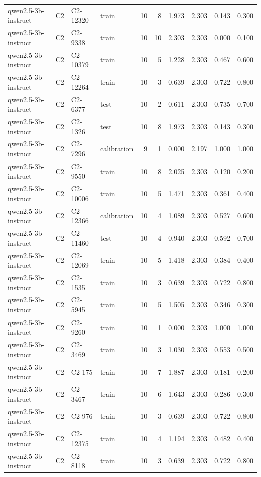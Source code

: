 \begin{table}
\begin{tabular}{llllrrrrrr}
qwen2.5-3b-instruct & C2 & C2-12320 & train & 10 & 8 & 1.973 & 2.303 & 0.143 & 0.300 \\
qwen2.5-3b-instruct & C2 & C2-9338 & train & 10 & 10 & 2.303 & 2.303 & 0.000 & 0.100 \\
qwen2.5-3b-instruct & C2 & C2-10379 & train & 10 & 5 & 1.228 & 2.303 & 0.467 & 0.600 \\
qwen2.5-3b-instruct & C2 & C2-12264 & train & 10 & 3 & 0.639 & 2.303 & 0.722 & 0.800 \\
qwen2.5-3b-instruct & C2 & C2-6377 & test & 10 & 2 & 0.611 & 2.303 & 0.735 & 0.700 \\
qwen2.5-3b-instruct & C2 & C2-1326 & test & 10 & 8 & 1.973 & 2.303 & 0.143 & 0.300 \\
qwen2.5-3b-instruct & C2 & C2-7296 & calibration & 9 & 1 & 0.000 & 2.197 & 1.000 & 1.000 \\
qwen2.5-3b-instruct & C2 & C2-9550 & train & 10 & 8 & 2.025 & 2.303 & 0.120 & 0.200 \\
qwen2.5-3b-instruct & C2 & C2-10006 & train & 10 & 5 & 1.471 & 2.303 & 0.361 & 0.400 \\
qwen2.5-3b-instruct & C2 & C2-12366 & calibration & 10 & 4 & 1.089 & 2.303 & 0.527 & 0.600 \\
qwen2.5-3b-instruct & C2 & C2-11460 & test & 10 & 4 & 0.940 & 2.303 & 0.592 & 0.700 \\
qwen2.5-3b-instruct & C2 & C2-12069 & train & 10 & 5 & 1.418 & 2.303 & 0.384 & 0.400 \\
qwen2.5-3b-instruct & C2 & C2-1535 & train & 10 & 3 & 0.639 & 2.303 & 0.722 & 0.800 \\
qwen2.5-3b-instruct & C2 & C2-5945 & train & 10 & 5 & 1.505 & 2.303 & 0.346 & 0.300 \\
qwen2.5-3b-instruct & C2 & C2-9260 & train & 10 & 1 & 0.000 & 2.303 & 1.000 & 1.000 \\
qwen2.5-3b-instruct & C2 & C2-3469 & train & 10 & 3 & 1.030 & 2.303 & 0.553 & 0.500 \\
qwen2.5-3b-instruct & C2 & C2-175 & train & 10 & 7 & 1.887 & 2.303 & 0.181 & 0.200 \\
qwen2.5-3b-instruct & C2 & C2-3467 & train & 10 & 6 & 1.643 & 2.303 & 0.286 & 0.300 \\
qwen2.5-3b-instruct & C2 & C2-976 & train & 10 & 3 & 0.639 & 2.303 & 0.722 & 0.800 \\
qwen2.5-3b-instruct & C2 & C2-12375 & train & 10 & 4 & 1.194 & 2.303 & 0.482 & 0.400 \\
qwen2.5-3b-instruct & C2 & C2-8118 & train & 10 & 3 & 0.639 & 2.303 & 0.722 & 0.800 \\

\end{tabular}
\end{table}
